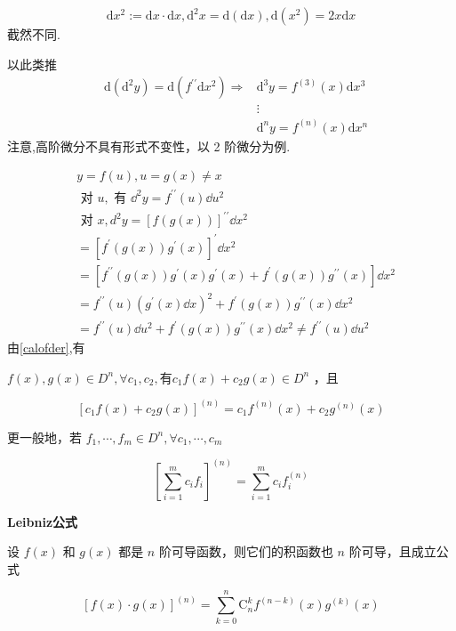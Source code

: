 $$\mathrm{d}x^2:=\mathrm{d}x\cdot\mathrm{d}x,\mathrm{d}^2x=\mathrm{d}(\mathrm{d}x),\mathrm{d}(x^2)=2x\mathrm{d}x$$
截然不同.

以此类推
$$\begin{aligned}
	&\mathrm{d}(\mathrm{d}^2y)=\mathrm{d}(f^{\prime\prime}\mathrm{d}x^2)\Rightarrow&\mathrm{d}^3y=f^{(3)}(x)\mathrm{d}x^3\\
	&&\vdots\\
	&&\mathrm{d}^ny=f^{(n)}(x)\mathrm{d}x^n
\end{aligned}$$
注意,高阶微分不具有形式不变性，以 2 阶微分为例.

$$
\begin{aligned}
	& y=f(u), u=g(x) \neq x \\
	& \text { 对 } u, \text { 有 } \dd^2 y=f^{\prime \prime}(u) \dd u^2 \\
	& \text { 对 } x, d^2 y=[f(g(x))]^{\prime \prime} \dd x^2 \\
	& =\left[f^{\prime}(g(x)) g^{\prime}(x)\right]^{\prime} \dd x^2 \\
	& =\left[f^{\prime \prime}(g(x)) g^{\prime}(x) g^{\prime}(x)+f^{\prime}(g(x)) g^{\prime \prime}(x)\right] \dd x^2 \\
	& =f^{\prime \prime}(u)\left(g^{\prime}(x) \dd x\right)^2+f^{\prime}(g(x)) g^{\prime \prime}(x) \dd x^2 \\
	& =f^{\prime \prime}(u) \dd u^2+f^{\prime}(g(x)) g^{\prime \prime}(x) \dd x^2 \neq f^{\prime \prime}(u) \dd u^2
\end{aligned}
$$
由\ref{calofder},有
\begin{proposition}
	$f(x), g(x) \in D^n, \forall c_1, c_2,\text{有} c_1 f(x)+c_2 g(x) \in D^n$ ，且
	
	$$
	\left[c_1 f(x)+c_2 g(x)\right]^{(n)}=c_1 f^{(n)}(x)+c_2 g^{(n)}(x)
	$$
	
	
	更一般地，若 $f_1, \cdots, f_m \in D^n, \forall c_1, \cdots, c_m$
	
	$$
	\left[\sum_{i=1}^m c_i f_i\right] ^{(n)}=\sum_{i=1}^m c_i f_i^{(n)}
	$$
\end{proposition}
\begin{proposition}
	\textbf{Leibniz公式}
	
	设 $f(x)$ 和 $g(x)$ 都是 $n$ 阶可导函数，则它们的积函数也 $n$ 阶可导，且成立公式
	
	$$
	[f(x) \cdot g(x)]^{(n)}=\sum_{k=0}^n \mathrm{C}_n^k f^{(n-k)}(x) g^{(k)}(x)
	$$
\end{proposition}
